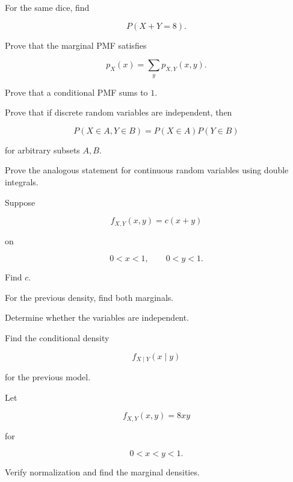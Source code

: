 \begin{exercise}[2]
For the same dice, find

\[
P(X+Y=8).
\]
\end{exercise}

\begin{exercise}[3]
Prove that the marginal PMF satisfies

\[
p_X(x)=\sum_y p_{X,Y}(x,y).
\]
\end{exercise}

\begin{exercise}[3]
Prove that a conditional PMF sums to \(1\).
\end{exercise}

\begin{exercise}[3]
Prove that if discrete random variables are independent, then

\[
P(X\in A,Y\in B)
=
P(X\in A)P(Y\in B)
\]

for arbitrary subsets \(A,B\).
\end{exercise}

\begin{exercise}[3]
Prove the analogous statement for continuous random variables using
double integrals.
\end{exercise}

\begin{exercise}[3]
Suppose

\[
f_{X,Y}(x,y)
=
c(x+y)
\]

on

\[
0<x<1,
\qquad
0<y<1.
\]

Find \(c\).
\end{exercise}

\begin{exercise}[3]
For the previous density, find both marginals.
\end{exercise}

\begin{exercise}[3]
Determine whether the variables are independent.
\end{exercise}

\begin{exercise}[3]
Find the conditional density

\[
f_{X\mid Y}(x\mid y)
\]

for the previous model.
\end{exercise}

\begin{exercise}[3]
Let

\[
f_{X,Y}(x,y)=8xy
\]

for

\[
0<x<y<1.
\]

Verify normalization and find the marginal densities.
\end{exercise}

